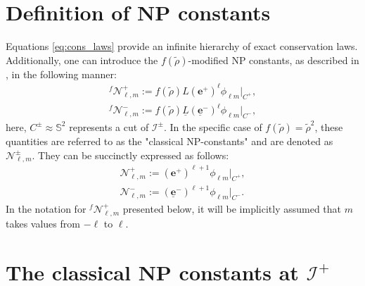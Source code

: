 \section{Definition of NP constants}
\label{sec:NP_constants}

Equations \eqref{eq:cons_laws} provide an infinite hierarchy of exact conservation laws. Additionally, one can introduce the $f(\tilde{\rho})$-modified NP constants, as described in \cite{GajKehLeo22}, in the following manner: 
\begin{align}\label{eq:DefModifiedNP}
  {}^{f}\mathcal{N}^{+}_{\ell,m}:= f(\tilde{\rho})L (\boldsymbol{e}^{+})^{\ell}\phi_{\ell m} \Big|_{{C}^{+}}, \\ 
  {}^{f}\mathcal{N}^{-}_{\ell,m}:= f(\tilde{\rho})\underline{L} (\boldsymbol{\underline{e}}^{-})^{\ell}\phi_{\ell m}\Big|_{{C}^{-}},
\end{align}
here, ${C^{\pm}} \approx \mathbb{S}^2$ represents a cut of $\mathscr{I}^{\pm}$. In the specific case of $f(\tilde{\rho})=\tilde{\rho}^2$, these quantities are referred to as the "classical NP-constants" and are denoted as $\mathcal{N}^{\pm}_{\ell,m}$. They can be succinctly expressed as follows:
\begin{align}\label{eq:classicalNP}
  \mathcal{N}^{+}_{\ell,m}:= (\boldsymbol{e}^{+})^{\ell+1}\phi_{\ell m}\Big|_{{C}^{+}},\\ 
  \mathcal{N}^{-}_{\ell,m}:= (\boldsymbol{\underline{e}}^{-})^{\ell+1}\phi_{\ell m} \Big|_{{C}^{-}}.
\end{align}
In the notation for ${}^{f}\mathcal{N}^{+}_{\ell,m}$ presented below, it will be implicitly assumed that $m$ takes values from $-\ell$ to $\ell$.
\section{The classical NP constants at $\mathscr{I}^{+}$}
\label{sec:classicalNP}


